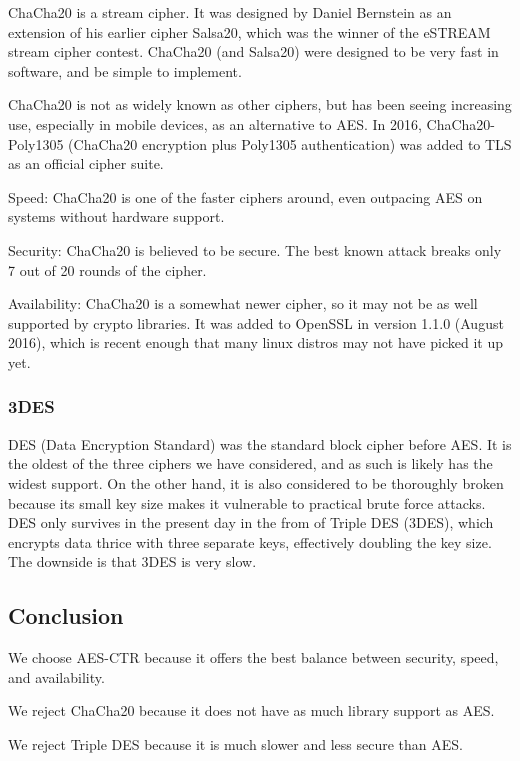 \documentclass[onecolumn, draftclsnofoot,10pt, compsoc]{IEEEtran}
\begin{document}
ChaCha20 \cite{chacha} is a stream cipher. It was designed by Daniel Bernstein as an extension of his earlier cipher Salsa20, which was the winner of the eSTREAM stream cipher contest.
ChaCha20 (and Salsa20) were designed to be very fast in software, and be simple to implement.

ChaCha20 is not as widely known as other ciphers, but has been seeing increasing use, especially in mobile devices, as an alternative to AES. In 2016, ChaCha20-Poly1305 (ChaCha20 encryption plus Poly1305 authentication) was added to TLS as an official cipher suite. \cite{rfc7905}

Speed: ChaCha20 is one of the faster ciphers around, even outpacing AES on systems without hardware support. \cite{eBACS}

Security: ChaCha20 is believed to be secure. The best known attack breaks only 7 out of 20 rounds of the cipher. %

Availability: ChaCha20 is a somewhat newer cipher, so it may not be as well supported by crypto libraries. It was added to OpenSSL in version 1.1.0 (August 2016), which is recent enough that many linux distros may not have picked it up yet.

\subsubsection{ 3DES }

DES (Data Encryption Standard) was the standard block cipher before AES. It is the oldest of the three ciphers we have considered, and as such is likely has the widest support. On the other hand, it is also considered to be thoroughly broken because its small key size makes it vulnerable to practical brute force attacks. DES only survives in the present day in the from of Triple DES (3DES), which encrypts data thrice with three separate keys, effectively doubling the key size. The downside is that 3DES is very slow.

\subsection{ Conclusion }

We choose AES-CTR because it offers the best balance between security, speed, and availability.

We reject ChaCha20 because it does not have as much library support as AES.

We reject Triple DES because it is much slower and less secure than AES.
\end{document}
